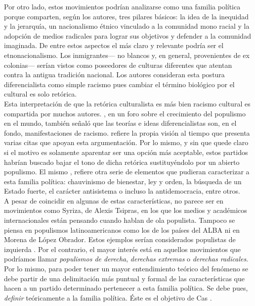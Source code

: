 Por otro lado, estos movimientos podrían analizarse como una familia política porque comparten, según los autores, tres pilares básicos: la idea de la inequidad y la jerarquía, un nacionalismo étnico vinculado a la comunidad mono racial y la adopción de medios radicales para lograr sus objetivos y defender a la comunidad imaginada. De entre estos aspectos el más claro y relevante podría ser el etnonacionalismo. Los inmigrantes--- no blancos y, en general, provenientes de ex colonias--- serían vistos como poseedores de culturas diferentes que atentan contra la antigua tradición nacional. Los autores consideran esta postura diferencialista como simple racismo pues cambiar el término biológico por el cultural es solo retórica.\\

Esta interpretación de que la retórica culturalista es más bien racismo cultural es compartida por muchos autores. \textcite{Goodliffe17}, en un foro sobre el crecimiento del populismo en el mundo, también señaló que las teorías e ideas diferencialistas son, en el fondo, manifestaciones de racismo.  \textcite{Hainsworth16a} refiere la propia visión al tiempo que presenta varias citas que apoyan esta argumentación. Por lo mismo, y sin que quede claro si el motivo es solamente aparentar ser una opción más aceptable, estos partidos habrían buscado bajar el tono de dicha retórica sustituyéndolo por un abierto populismo. El mismo \textcite{Hainsworth16a}, refiere otra serie de elementos que pudieran caracterizar a esta familia política: chauvinismo de bienestar, ley y orden, la búsqueda de un Estado fuerte, el carácter antisistema o incluso la antidemocracia, entre otros.\\ 

A pesar de coincidir en algunas de estas características, no parece ser en movimientos como Syriza, de Alexis Tsipras, en los que los medios y académicos internacionales están pensando cuando hablan de ola populista. Tampoco se piensa en populismos latinoamericanos como los de los países del ALBA ni en Morena de López Obrador. Estos ejemplos serían considerados populistas de izquierda \parencite{MuddeRovira17}. Por el contrario, el mayor interés está en aquellos movimientos que podríamos llamar \textit{populismos de derecha}, \textit{derechas extremas} o \textit{derechas radicales}.\\

Por lo mismo, para poder tener un mayor entendimiento teórico del fenómeno se debe partir de una delimitación más puntual y formal de las características que hacen a un partido determinado pertenecer a esta familia política. Se debe pues, \textit{definir} teóricamente a la familia política. Éste es el objetivo de Cas \textcite{Mudde07a}. 
\nopagebreak

